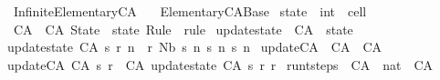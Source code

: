 %
\begin{isabellebody}%
%
%
\isadelimdocument
%
\endisadelimdocument
%
\isatagdocument
%
\isamarkuptrue%
%
\endisatagdocument
{\isafolddocument}%
%
\isadelimdocument
%
\endisadelimdocument
%
\isadelimtheory
%
\endisadelimtheory
%
\isatagtheory
{}\isamarkupfalse%
\ Infinite{\isacharunderscore}Elementary{\isacharunderscore}CA\isanewline
\ \ \ Elementary{\isacharunderscore}CA{\isacharunderscore}Base\isanewline
{}%
\endisatagtheory
{\isafoldtheory}%
%
\isadelimtheory
\isanewline
%
\endisadelimtheory
\isanewline
{}\isamarkupfalse%
\ state\ {\isacharequal}\ {\isachardoublequoteopen}int\ {\isasymRightarrow}\ cell{\isachardoublequoteclose}\isanewline
\isanewline
{}\isamarkupfalse%
\ CA\ {\isacharequal}\ CA\ {\isacharparenleft}State\ {\isacharcolon}\ state{\isacharparenright}\ {\isacharparenleft}Rule\ {\isacharcolon}\ rule{\isacharparenright}\isanewline
\isanewline
{}\isamarkupfalse%
\ update{\isacharunderscore}state\ {\isacharcolon}{\isacharcolon}\ {\isachardoublequoteopen}CA\ {\isasymRightarrow}\ state{\isachardoublequoteclose}\ \isanewline
{\isachardoublequoteopen}update{\isacharunderscore}state\ {\isacharparenleft}CA\ s\ r{\isacharparenright}\ n\ {\isacharequal}\ r\ {\isacharparenleft}Nb\ {\isacharparenleft}s\ {\isacharparenleft}n{\isacharminus}{}{\isacharparenright}{\isacharparenright}\ {\isacharparenleft}s\ n{\isacharparenright}\ {\isacharparenleft}s\ {\isacharparenleft}n{\isacharplus}{}{\isacharparenright}{\isacharparenright}{\isacharparenright}{\isachardoublequoteclose}\isanewline
\isanewline
{}\isamarkupfalse%
\ update{\isacharunderscore}CA\ {\isacharcolon}{\isacharcolon}\ {\isachardoublequoteopen}CA\ {\isasymRightarrow}\ CA{\isachardoublequoteclose}\ \isanewline
{\isachardoublequoteopen}update{\isacharunderscore}CA\ {\isacharparenleft}CA\ s\ r{\isacharparenright}\ {\isacharequal}\ CA\ {\isacharparenleft}update{\isacharunderscore}state\ {\isacharparenleft}CA\ s\ r{\isacharparenright}{\isacharparenright}\ r{\isachardoublequoteclose}\isanewline
\isanewline
{}\isamarkupfalse%
\ run{\isacharunderscore}t{\isacharunderscore}steps\ {\isacharcolon}{\isacharcolon}\ {\isachardoublequoteopen}CA\ {\isasymRightarrow}\ nat\ {\isasymRightarrow}\ CA{\isachardoublequoteclose}\ \isanewline

\end{isabellebody}
